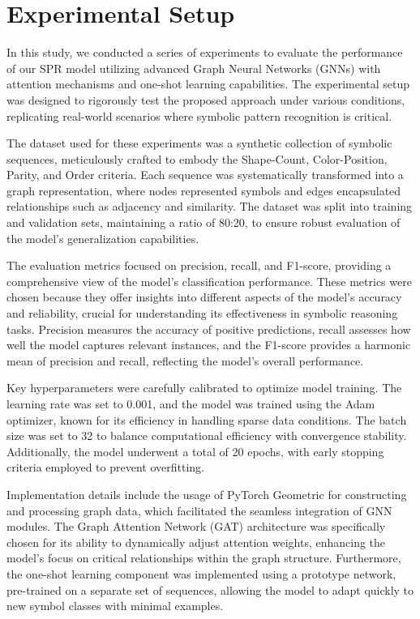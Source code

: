 \documentclass{article}
\begin{document}
\section{Experimental Setup}
In this study, we conducted a series of experiments to evaluate the performance of our SPR model utilizing advanced Graph Neural Networks (GNNs) with attention mechanisms and one-shot learning capabilities. The experimental setup was designed to rigorously test the proposed approach under various conditions, replicating real-world scenarios where symbolic pattern recognition is critical.

The dataset used for these experiments was a synthetic collection of symbolic sequences, meticulously crafted to embody the Shape-Count, Color-Position, Parity, and Order criteria. Each sequence was systematically transformed into a graph representation, where nodes represented symbols and edges encapsulated relationships such as adjacency and similarity. The dataset was split into training and validation sets, maintaining a ratio of 80:20, to ensure robust evaluation of the model's generalization capabilities.

The evaluation metrics focused on precision, recall, and F1-score, providing a comprehensive view of the model's classification performance. These metrics were chosen because they offer insights into different aspects of the model's accuracy and reliability, crucial for understanding its effectiveness in symbolic reasoning tasks. Precision measures the accuracy of positive predictions, recall assesses how well the model captures relevant instances, and the F1-score provides a harmonic mean of precision and recall, reflecting the model's overall performance.

Key hyperparameters were carefully calibrated to optimize model training. The learning rate was set to 0.001, and the model was trained using the Adam optimizer, known for its efficiency in handling sparse data conditions. The batch size was set to 32 to balance computational efficiency with convergence stability. Additionally, the model underwent a total of 20 epochs, with early stopping criteria employed to prevent overfitting.

Implementation details include the usage of PyTorch Geometric for constructing and processing graph data, which facilitated the seamless integration of GNN modules. The Graph Attention Network (GAT) architecture was specifically chosen for its ability to dynamically adjust attention weights, enhancing the model's focus on critical relationships within the graph structure. Furthermore, the one-shot learning component was implemented using a prototype network, pre-trained on a separate set of sequences, allowing the model to adapt quickly to new symbol classes with minimal examples.
\end{document}
